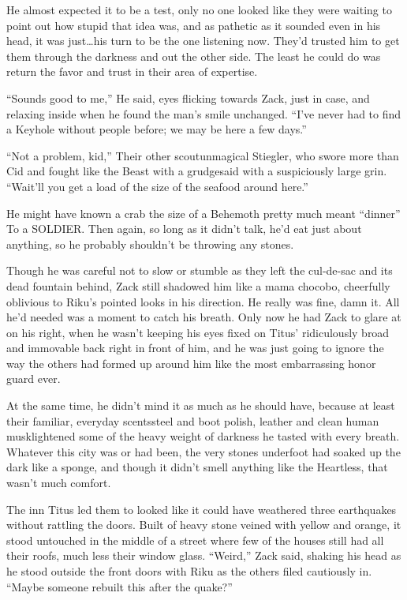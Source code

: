 He almost expected it to be a test, only no one looked like they were waiting to point out how stupid that idea was, and as pathetic as it sounded even in his head, it was just\ldots his turn to be the one listening now. They'd trusted him to get them through the darkness and out the other side. The least he could do was return the favor and trust in their area of expertise.

``Sounds good to me,'' He said, eyes flicking towards Zack, just in case, and relaxing inside when he found the man's smile unchanged. ``I've never had to find a Keyhole without people before; we may be here a few days.''

``Not a problem, kid,'' Their other scout\textemdash unmagical Stiegler, who swore more than Cid and fought like the Beast with a grudge\textemdash said with a suspiciously large grin. ``Wait'll you get a load of the size of the seafood around here.''

He might have known a crab the size of a Behemoth pretty much meant ``dinner'' To a SOLDIER. Then again, so long as it didn't talk, he'd eat just about anything, so he probably shouldn't be throwing any stones.

Though he was careful not to slow or stumble as they left the cul-de-sac and its dead fountain behind, Zack still shadowed him like a mama chocobo, cheerfully oblivious to Riku's pointed looks in his direction. He really was fine, damn it. All he'd needed was a moment to catch his breath. Only now he had Zack to glare at on his right, when he wasn't keeping his eyes fixed on Titus' ridiculously broad and immovable back right in front of him, and he was just going to ignore the way the others had formed up around him like the most embarrassing honor guard ever.

At the same time, he didn't mind it as much as he should have, because at least their familiar, everyday scents\textemdash steel and boot polish, leather and clean human musk\textemdash lightened some of the heavy weight of darkness he tasted with every breath. Whatever this city was or had been, the very stones underfoot had soaked up the dark like a sponge, and though it didn't smell anything like the Heartless, that wasn't much comfort.

The inn Titus led them to looked like it could have weathered three earthquakes without rattling the doors. Built of heavy stone veined with yellow and orange, it stood untouched in the middle of a street where few of the houses still had all their roofs, much less their window glass. ``Weird,'' Zack said, shaking his head as he stood outside the front doors with Riku as the others filed cautiously in. ``Maybe someone rebuilt this after the quake?''

